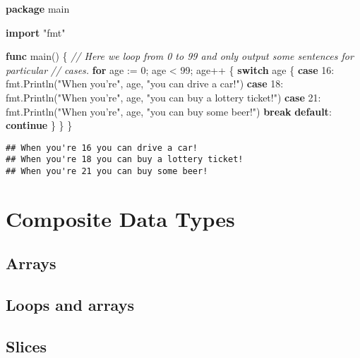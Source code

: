 \documentclass[]{book}
\newenvironment{Shaded}{\begin{snugshade}}{\end{snugshade}}
\newcommand{\CommentTok}[1]{\textcolor[rgb]{0.56,0.35,0.01}{\textit{#1}}}
\newcommand{\DecValTok}[1]{\textcolor[rgb]{0.00,0.00,0.81}{#1}}
\newcommand{\KeywordTok}[1]{\textcolor[rgb]{0.13,0.29,0.53}{\textbf{#1}}}
\newcommand{\NormalTok}[1]{#1}
\newcommand{\StringTok}[1]{\textcolor[rgb]{0.31,0.60,0.02}{#1}}
\begin{document}
\begin{Shaded}
\begin{Highlighting}[]
\KeywordTok{package}\NormalTok{ main}

\KeywordTok{import} \StringTok{"fmt"}

\KeywordTok{func}\NormalTok{ main() \{}
    \CommentTok{// Here we loop from 0 to 99 and only output some sentences for particular}
    \CommentTok{// cases.}
    \KeywordTok{for}\NormalTok{ age := }\DecValTok{0}\NormalTok{; age < }\DecValTok{99}\NormalTok{; age++ \{}
        \KeywordTok{switch}\NormalTok{ age \{}
        \KeywordTok{case} \DecValTok{16}\NormalTok{:}
\NormalTok{            fmt.Println(}\StringTok{"When you're"}\NormalTok{, age, }\StringTok{"you can drive a car!"}\NormalTok{)}
        \KeywordTok{case} \DecValTok{18}\NormalTok{:}
\NormalTok{            fmt.Println(}\StringTok{"When you're"}\NormalTok{, age, }\StringTok{"you can buy a lottery ticket!"}\NormalTok{)}
        \KeywordTok{case} \DecValTok{21}\NormalTok{:}
\NormalTok{            fmt.Println(}\StringTok{"When you're"}\NormalTok{, age, }\StringTok{"you can buy some beer!"}\NormalTok{)}
            \KeywordTok{break}
        \KeywordTok{default}\NormalTok{:}
            \KeywordTok{continue}
\NormalTok{        \}}
\NormalTok{    \}}
\NormalTok{\}}
\end{Highlighting}
\end{Shaded}

\begin{verbatim}
## When you're 16 you can drive a car!
## When you're 18 you can buy a lottery ticket!
## When you're 21 you can buy some beer!
\end{verbatim}

\hypertarget{composite-data-types}{%
\chapter{Composite Data Types}\label{composite-data-types}}

\hypertarget{arrays}{%
\section{Arrays}\label{arrays}}

\hypertarget{loops-and-arrays}{%
\section{Loops and arrays}\label{loops-and-arrays}}

\hypertarget{slices}{%
\section{Slices}\label{slices}}
\end{document}
